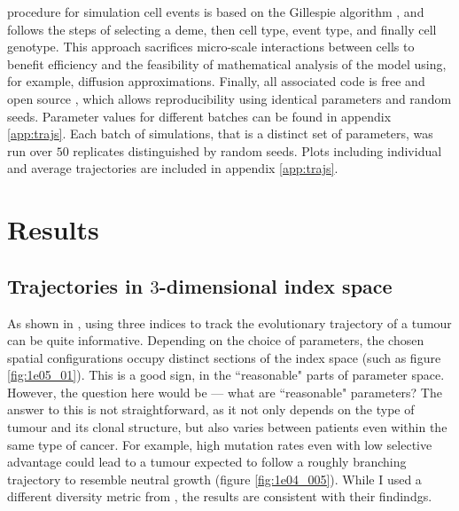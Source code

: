 procedure for simulation cell events is based on the Gillespie algorithm
\cite{gillespie_exact_1977}, and follows the steps of selecting a deme, then
cell type, event type, and finally cell genotype. This approach sacrifices
micro-scale interactions between cells to benefit efficiency and the feasibility
of mathematical analysis of the model using, for example, diffusion
approximations. Finally, all associated code is free and open source
\cite{noble_demon_2020, vesmanojlovic_trajectories,
kimverity_kimverityruiindices_2023}, which allows reproducibility using
identical parameters and random seeds. Parameter values for different batches
can be found in appendix \ref{app:trajs}. Each batch of simulations, that is a
distinct set of parameters, was run over $50$ replicates distinguished by
random seeds. Plots including individual and average trajectories are included
in appendix \ref{app:trajs}.


\section{Results}

\subsection{Trajectories in $3$-dimensional index space}

As shown in \cite{noble_spatial_2022}, using three indices to track the
evolutionary trajectory of a tumour can be quite informative. Depending on the
choice of parameters, the chosen spatial configurations occupy distinct sections
of the index space (such as figure \ref{fig:1e05_01}). This is a good sign, in
the ``reasonable" parts of parameter space. However, the question here would be
--- what are ``reasonable" parameters? The answer to this is not
straightforward, as it not only depends on the type of tumour and its clonal
structure, but also varies between patients even within the same type of
cancer. For example, high mutation rates even with low selective advantage
could lead to a tumour expected to follow a roughly branching trajectory to
resemble neutral growth (figure \ref{fig:1e04_005}). While I used a different
diversity metric from \cite{noble_spatial_2022}, the results are consistent with
their findindgs.

